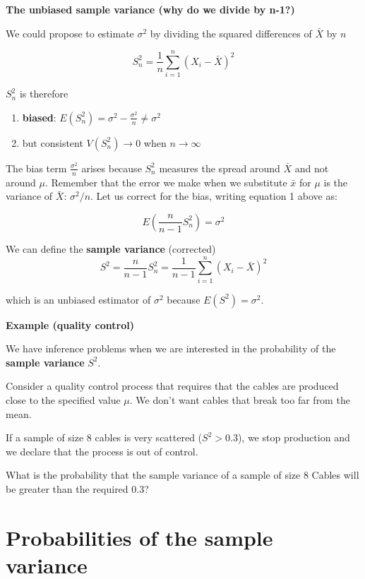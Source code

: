 \documentclass[
]{book}
\providecommand{\tightlist}{%
  \setlength{\itemsep}{0pt}\setlength{\parskip}{0pt}}
\begin{document}
\textbf{The unbiased sample variance (why do we divide by n-1?)}

We could propose to estimate \(\sigma^2\) by dividing the squared differences of \(\bar{X}\) by \(n\)

\[S_n^2=\frac{1}{n}\sum_{i=1}^n(X_i-\bar{X})^2\]

\(S_n^2\) is therefore

\begin{enumerate}
\def\labelenumi{\arabic{enumi})}
\tightlist
\item
  \textbf{biased}: \(E(S_n^2) = \sigma^2-\frac{\sigma^2}{n} \neq \sigma^2\)
\item
  but consistent \(V(S_n^2) \rightarrow 0\) when \(n\rightarrow \infty\)
\end{enumerate}

The bias term \(\frac{\sigma^2}{n}\) arises because \(S_n^2\) measures the spread around \(\bar{X}\) and not around \(\mu\). Remember that the error we make when we substitute \(\bar{x}\) for \(\mu\) is the variance of \(\bar{X}\): \(\sigma^2/n\). Let us correct for the bias, writing equation 1 above as:

\[E(\frac{n}{n-1}S_n^2)=\sigma^2\]

We can define the \textbf{sample variance} (corrected) \[S^2=\frac{n}{n-1}S_n^2=\frac{1}{n-1}\sum_{i=1}^ n(X_i-\bar{X})^2\]

which is an unbiased estimator of \(\sigma^2\) because \(E(S^2)=\sigma^2\).

\textbf{Example (quality control)}

We have inference problems when we are interested in the probability of the \textbf{sample variance} \(S^2\).

Consider a quality control process that requires that the cables are produced close to the specified value \(\mu\). We don't want cables that break too far from the mean.

If a sample of size \(8\) cables is very scattered (\(S^2>0.3\)), we stop production and we declare that the process is out of control.

What is the probability that the sample variance of a sample of size \(8\) Cables will be greater than the required \(0.3\)?

\hypertarget{probabilities-of-the-sample-variance}{%
\section{Probabilities of the sample variance}\label{probabilities-of-the-sample-variance}}
\end{document}
